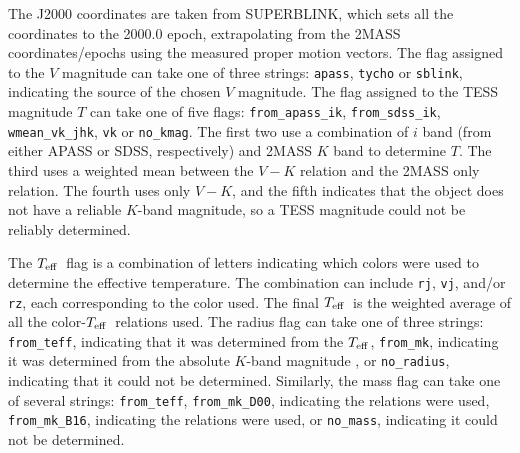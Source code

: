 \documentclass[twocolumn]{aastex62}
\newcommand{\teff}{$T_{\rm eff}$}
\begin{document}
The J2000 coordinates are taken from SUPERBLINK, which sets all the coordinates to the 2000.0 epoch, extrapolating from the 2MASS coordinates/epochs using the measured proper motion vectors.  The flag assigned to the $V$ magnitude can take one of three strings: {\tt apass}, {\tt tycho} or {\tt sblink}, indicating the source of the chosen $V$ magnitude.  The flag assigned to the TESS magnitude $T$ can take one of five flags: {\tt from\_apass\_ik}, {\tt from\_sdss\_ik}, {\tt wmean\_vk\_jhk}, {\tt vk} or {\tt no\_kmag}.  The first two use a combination of $i$ band (from either APASS or SDSS, respectively) and 2MASS $K$ band to determine $T$.  The third uses a weighted mean between the $V-K$ relation and the 2MASS only relation.  The fourth uses only $V-K$, and the fifth indicates that the object does not have a reliable $K$-band magnitude, so a TESS magnitude could not be reliably determined.

The \teff\ flag is a combination of letters indicating which colors were used to determine the effective temperature.  The combination can include {\tt rj}, {\tt vj}, and/or {\tt rz}, each corresponding to the color used.  The final \teff\ is the weighted average of all the color-\teff\ relations used.  The radius flag can take one of three strings: {\tt from\_teff}, indicating that it was determined from the \teff, {\tt from\_mk}, indicating it was determined from the absolute $K$-band magnitude \citep[][]{Mann2015}, or {\tt no\_radius}, indicating that it could not be determined.  Similarly, the mass flag can take one of several strings: {\tt from\_teff}, {\tt from\_mk\_D00}, indicating the \citet[][]{Delfosse2000} relations were used, {\tt from\_mk\_B16}, indicating the \citet[][]{Benedict2016} relations were used, or {\tt no\_mass}, indicating it could not be determined.
\end{document}
